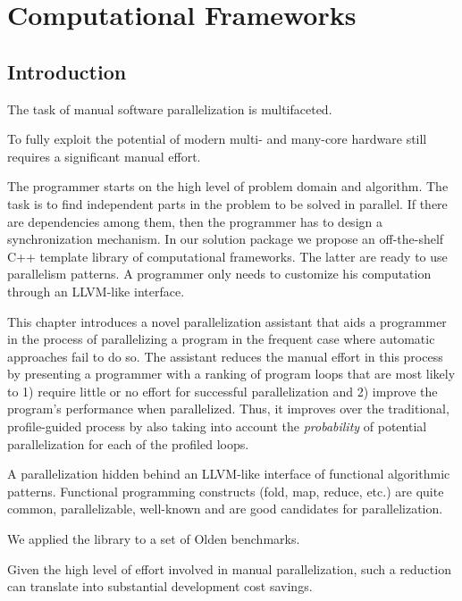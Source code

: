 \chapter{Computational Frameworks}

\section{Introduction}


\quad The task of manual software parallelization is multifaceted. 

To fully exploit the potential of modern multi- and many-core hardware still requires a significant manual effort.


\quad The programmer starts on the high level of problem domain and algorithm. The task is to find independent parts in the problem to be solved in parallel. If there are dependencies among them, then the programmer has to design a synchronization mechanism. In our solution package we propose an off-the-shelf C++ template library of computational frameworks. The latter are ready to use parallelism patterns. A programmer only needs to customize his computation through an LLVM-like interface.

This chapter introduces a novel parallelization assistant that aids a programmer in the process of parallelizing a program in the frequent case where automatic approaches fail to do so.
%
The assistant reduces the manual effort in this process by presenting a programmer with a ranking of program loops that are most likely to 1) require little or no effort for successful parallelization and 2) improve the program's performance when parallelized.
%
Thus, it improves over the traditional, profile-guided process by also taking into account the \emph{probability} of potential parallelization for each of the profiled loops.


A parallelization hidden behind an LLVM-like interface of functional algorithmic patterns. 
%
Functional programming constructs (fold, map, reduce, etc.) are quite common, parallelizable, well-known and are good candidates for parallelization.

We applied the library to a set of Olden benchmarks.

%
Given the high level of effort involved in manual parallelization, such a reduction can translate into substantial development cost savings.

